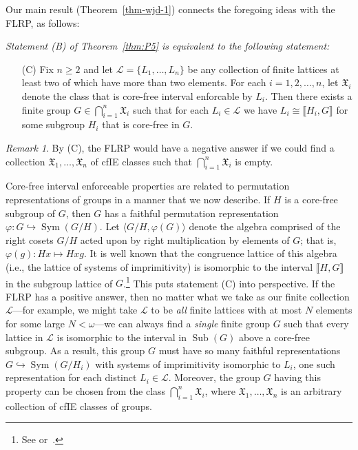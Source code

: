 \documentclass{gen-j-l}
\newcommand{\lb}{\ensuremath{\llbracket}}
\newcommand{\rb}{\ensuremath{\rrbracket}}
\newcommand{\<}{\ensuremath{\langle}}
\renewcommand{\>}{\ensuremath{\rangle}}
\theoremstyle{plain}
\theoremstyle{definition}
\theoremstyle{remark}
\newtheorem*{remark}{Remark}
\numberwithin{theorem}{section}
\numberwithin{claim}{section}
\numberwithin{equation}{section}
\numberwithin{conjecture}{section}
\renewcommand{\leq}{\ensuremath{\leqslant}}
\renewcommand{\geq}{\ensuremath{\geqslant}}
\newcommand{\Con}{\ensuremath{\operatorname{Con}}}
\newcommand{\Sub}{\ensuremath{\operatorname{Sub}}}
\newcommand{\Sym}{\ensuremath{\operatorname{Sym}}}
\newcommand{\2}{\ensuremath{\mathbf{2}}}
\newcommand{\3}{\ensuremath{\mathbf{3}}}
\newcommand{\sG}{\ensuremath{\mathfrak{X}}}
\newcommand{\sL}{\ensuremath{\mathscr{L}}}
\renewcommand{\phi}{\ensuremath{\varphi}}
\begin{document}
Our main result (Theorem~\ref{thm-wjd-1}) connects the
foregoing ideas with the \acs{FLRP}, as follows:\\[6pt]
{\it 
Statement (B) of Theorem~\ref{thm:P5} is equivalent to the following statement:

\begin{enumerate}
\item[(C)]
Fix $n\geq 2$ and let $\sL = \{L_1, \dots, L_n\}$ be any collection of
finite lattices at least two of which have more than two elements.
For each $i = 1, 2, \dots, n$, let $\sG_i$ denote the class that is
core-free interval enforcable by $L_i$. Then there exists a finite group $G \in
\bigcap\limits_{i=1}^n \sG_i$ such that for 
each $L_i \in \sL$ we have $L_i\cong \lb H_i, G \rb$ for some subgroup
$H_i$ that is core-free in $G$. %
\end{enumerate}

\begin{remark}
By (C), the \acs{FLRP} would have a negative answer if we
could find a collection $\sG_1, \dots, \sG_n$ of \acs{cfIE} classes
such that $\bigcap\limits_{i=1}^n \sG_i$ is empty.
\end{remark}
}

Core-free interval enforceable properties are related to
permutation representations of groups in a manner that we now describe.
If $H$ is a core-free subgroup of $G$, then $G$ has a faithful permutation 
representation $\phi:G\hookrightarrow \Sym(G/H)$.
Let $\<G/H, \phi(G)\>$ denote the algebra comprised of the right cosets
$G/H$ acted upon by right multiplication by elements of $G$; that is,
$\phi(g): Hx \mapsto Hxg$.  It is
well known that the congruence lattice of this algebra (i.e., the lattice of
systems of imprimitivity) %
 is isomorphic to the interval $\lb H, G \rb$ in the subgroup
lattice of $G$.\footnote{See \cite[Lemma 4.20]{alvi:1987}
or~\cite[Theorem 1.5A]{Dixon:1996}.}
This puts statement (C) into perspective.
If the \acs{FLRP} has a positive answer, then no matter 
what we take as our finite collection $\sL$---for example, we
might take $\sL$ to be \emph{all} finite lattices with
at most $N$ elements for some large $N< \omega$---we can always find a \emph{single}
finite group $G$ such that every lattice in $\sL$ is isomorphic to the interval
in $\Sub(G)$ above a core-free subgroup.
As a result, this group $G$ must have so many faithful
representations  $G\hookrightarrow \Sym(G/H_i)$ with systems of imprimitivity
isomorphic to $L_i$,
one such
representation for each distinct $L_i\in \sL$.  Moreover, the group $G$ having
this property can be chosen from the class $\bigcap\limits_{i=1}^n \sG_i$, where 
$\sG_1, \dots, \sG_n$ is an arbitrary collection of \acs{cfIE} classes of groups.
\end{document}
